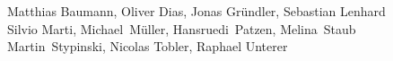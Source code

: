 %
%
%
Matthias Baumann,
Oliver Dias,
Jonas Gründler,
Sebastian Lenhard%
\\
Silvio Marti,
Michael~Müller,
Hansruedi~Patzen,
Melina~Staub%
\\
Martin~Stypinski,
Nicolas Tobler,
Raphael Unterer
\\
